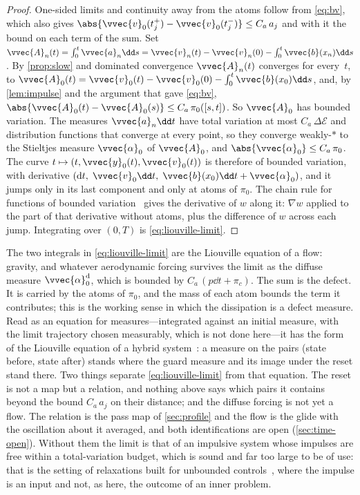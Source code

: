 \begin{proof}
One-sided limits and continuity away from the atoms follow from
\cref{eq:bv}, which also gives
$\abs{\vvec{v}_0(t_j^+)-\vvec{v}_0(t_j^-)}\le C_a\,a_j$ and with it the
bound on each term of the sum. Set
$\vvec{A}_n(t) = \int_0^t\vvec{a}_n\dd s
 = \vvec{v}_n(t)-\vvec{v}_n(0)-\int_0^t\vvec{b}(x_n)\dd s$. By
\cref{prop:slow} and dominated convergence $\vvec{A}_n(t)$ converges for
every~$t$, to
$\vvec{A}_0(t) = \vvec{v}_0(t)-\vvec{v}_0(0)-\int_0^t\vvec{b}(x_0)\dd s$,
and, by \cref{lem:impulse} and the argument that gave \cref{eq:bv},
$\abs{\vvec{A}_0(t)-\vvec{A}_0(s)}\le C_a\,\pi_0([s,t])$. So $\vvec{A}_0$
has bounded variation. The measures $\vvec{a}_n\dd t$ have total variation
at most $C_a\,\Delta\mathcal{E}$ and distribution functions that converge
at every point, so they converge weakly-$*$ to the Stieltjes measure
$\vvec{\alpha}_0$ of $\vvec{A}_0$, and
$\abs{\vvec{\alpha}_0}\le C_a\,\pi_0$. The curve
$t\mapsto(t,\vvec{y}_0(t),\vvec{v}_0(t))$ is therefore of bounded
variation, with derivative
$(\mathrm{d}t,\;\vvec{v}_0\dd t,\;\vvec{b}(x_0)\dd t + \vvec{\alpha}_0)$,
and it jumps only in its last component and only at atoms of $\pi_0$. The
chain rule for functions of bounded
variation~\cite[Theorem~3.96]{ambrosio2000functions} gives the derivative
of $w$ along it: $\nabla w$ applied to the part of that derivative without
atoms, plus the difference of $w$ across each jump. Integrating over
$(0,T)$ is \cref{eq:liouville-limit}.
\end{proof}

The two integrals in \cref{eq:liouville-limit} are the Liouville equation
of a flow: gravity, and whatever aerodynamic forcing survives the limit as
the diffuse measure $\vvec{\alpha}_0^{\mathrm{d}}$, which is bounded by
$C_a\,(p\dd t + \pi_c)$. The sum is the defect. It is carried by the atoms
of $\pi_0$, and the mass of each atom bounds the term it contributes; this
is the working sense in which the dissipation is a defect measure. Read as
an equation for measures---integrated against an initial measure, with the
limit trajectory chosen measurably, which is not done here---it has the
form of the Liouville equation of a hybrid
system~\cite{shia2014convex,zhao2020optimal}: a measure on the pairs
(state before, state after) stands where the guard measure and its image
under the reset stand there. Two things separate
\cref{eq:liouville-limit} from that equation. The reset is not a map but a
relation, and nothing above says which pairs it contains beyond the bound
$C_a\,a_j$ on their distance; and the diffuse forcing is not yet a flow.
The relation is the pass map of \cref{sec:profile} and the flow is the
glide with the oscillation about it averaged, and both identifications are
open (\cref{sec:time-open}). Without them the limit is that of an
impulsive system whose impulses are free within a total-variation budget,
which is sound and far too large to be of use: that is the setting of
relaxations built for unbounded
controls~\cite{claeys2017semidefinite}, where the impulse is an input and
not, as here, the outcome of an inner problem.

